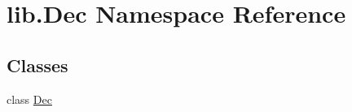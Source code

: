 \hypertarget{namespacelib_1_1_dec}{\section{lib.\-Dec Namespace Reference}
\label{namespacelib_1_1_dec}
}
\subsection*{Classes}
\begin{DoxyCompactItemize}
\item 
class \hyperlink{classlib_1_1_dec_1_1_dec}{Dec}
\end{DoxyCompactItemize}
